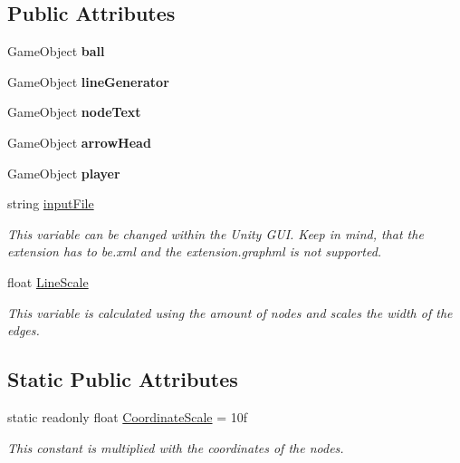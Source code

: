 \subsection*{Public Attributes}
\begin{DoxyCompactItemize}
\item 
\mbox{\label{class_graph_drawer_a8126f350e34da05796424c5794935b31}} 
Game\+Object {\bfseries ball}
\item 
\mbox{\label{class_graph_drawer_a50b22b89dca27e868e269266de9aa2a3}} 
Game\+Object {\bfseries line\+Generator}
\item 
\mbox{\label{class_graph_drawer_ab66ad8d286ed137049bf07ef1d3c6f45}} 
Game\+Object {\bfseries node\+Text}
\item 
\mbox{\label{class_graph_drawer_aee24df4051f8ef70b77f9fe680a3f5b9}} 
Game\+Object {\bfseries arrow\+Head}
\item 
\mbox{\label{class_graph_drawer_a271926d8a025465e75950519199a8fa7}} 
Game\+Object {\bfseries player}
\item 
string \mbox{\hyperlink{class_graph_drawer_a1264583a4ab9461d51c53c78ca12c5fa}{input\+File}}
\begin{DoxyCompactList}\small\item\em This variable can be changed within the Unity G\+UI. Keep in mind, that the extension has to be.\+xml and the extension.\+graphml is not supported. \end{DoxyCompactList}\item 
float \mbox{\hyperlink{class_graph_drawer_aa5ef4a330d302c0d55a33376a4727edf}{Line\+Scale}}
\begin{DoxyCompactList}\small\item\em This variable is calculated using the amount of nodes and scales the width of the edges. \end{DoxyCompactList}\end{DoxyCompactItemize}
\subsection*{Static Public Attributes}
\begin{DoxyCompactItemize}
\item 
static readonly float \mbox{\hyperlink{class_graph_drawer_a8e26c2305c588cd202dce84292b7cd14}{Coordinate\+Scale}} = 10f
\begin{DoxyCompactList}\small\item\em This constant is multiplied with the coordinates of the nodes. \end{DoxyCompactList}\end{DoxyCompactItemize}


